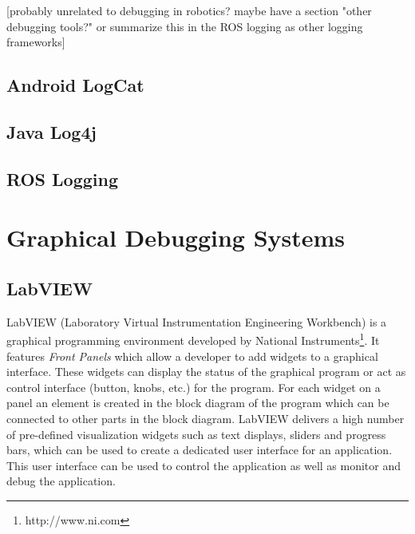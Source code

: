 [probably unrelated to debugging in robotics? maybe have a section "other debugging tools?" or summarize this in the ROS logging as other logging frameworks]
\subsection{Android LogCat}
\subsection{Java Log4j}
\subsection{ROS Logging}

\section{Graphical Debugging Systems}
\subsection{LabVIEW}

LabVIEW (Laboratory Virtual Instrumentation Engineering Workbench) is a graphical programming environment developed by National Instruments\footnote{http://www.ni.com}. It features \emph{Front Panels} which allow a developer to add widgets to a graphical interface. These widgets can display the status of the graphical program or act as control interface (button, knobs, etc.) for the program. For each widget on a panel an element is created in the block diagram of the program which can be connected to other parts in the block diagram. LabVIEW delivers a high number of pre-defined visualization widgets such as text displays, sliders and progress bars, which can be used to create a dedicated user interface for an application. This user interface can be used to control the application as well as monitor and debug the application.


